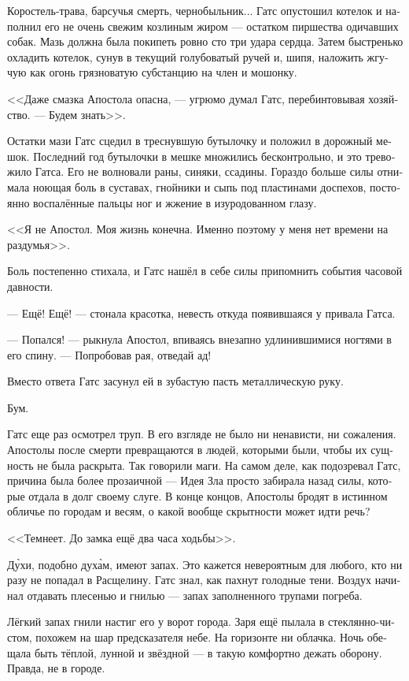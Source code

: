 \documentclass[a4paper,12pt,fleqn]{book}\usepackage{polyglossia}\setdefaultlanguage[babelshorthands=true]{russian}\setotherlanguage{english}\defaultfontfeatures{Ligatures=TeX,Mapping=tex-text}\usepackage{xcolor}\newcommand{\ml}[3]{#2}
\newcommand{\asterism}{\vspace{1em}{\centering\Large\bfseries$\ast~\ast~\ast$\par}\vspace{1em}}
\begin{document}
Коростель-трава, барсучья смерть, чернобыльник...
Гатс опустошил котелок и наполнил его не очень свежим козлиным жиром --- остатком пиршества одичавших собак.
Мазь должна была покипеть ровно сто три удара сердца.
Затем быстренько охладить котелок, сунув в текущий голубоватый ручей и, шипя, наложить жгучую как огонь грязноватую субстанцию на член и мошонку.

<<Даже смазка Апостола опасна, --- угрюмо думал Гатс, перебинтовывая хозяйство.
--- Будем знать>>.

Остатки мази Гатс сцедил в треснувшую бутылочку и положил в дорожный мешок.
Последний год бутылочки в мешке множились бесконтрольно, и это тревожило Гатса.
Его не волновали раны, синяки, ссадины.
Гораздо больше силы отнимала ноющая боль в суставах, гнойники и сыпь под пластинами доспехов, постоянно воспалённые пальцы ног и жжение в изуродованном глазу.

<<Я не Апостол.
Моя жизнь конечна.
Именно поэтому у меня нет времени на раздумья>>.

Боль постепенно стихала, и Гатс нашёл в себе силы припомнить события часовой давности.

--- Ещё!
Ещё! --- стонала красотка, невесть откуда появившаяся у привала Гатса.

--- Попался! --- рыкнула Апостол, впиваясь внезапно удлинившимися ногтями в его спину.
--- Попробовав рая, отведай ад!

Вместо ответа Гатс засунул ей в зубастую пасть металлическую руку.

Бум.

Гатс еще раз осмотрел труп.
В его взгляде не было ни ненависти, ни сожаления.
Апостолы после смерти превращаются в людей, которыми были, чтобы их сущность не была раскрыта.
Так говорили маги.
На самом деле, как подозревал Гатс, причина была более прозаичной --- Идея Зла просто забирала назад силы, которые отдала в долг своему слуге.
В конце концов, Апостолы бродят в истинном обличье по городам и весям, о какой вообще скрытности может идти речь?

<<Темнеет.
До замка ещё два часа ходьбы>>.

\asterism

Д\`{у}хи, подобно дух\`{а}м, имеют запах.
Это кажется невероятным для любого, кто ни разу не попадал в Расщелину.
Гатс знал, как пахнут голодные тени.
Воздух начинал отдавать плесенью и гнилью --- запах заполненного трупами погреба.

Лёгкий запах гнили настиг его у ворот города.
Заря ещё пылала в стеклянно-чистом, похожем на шар предсказателя небе.
На горизонте ни облачка.
Ночь обещала быть тёплой, лунной и звёздной --- в такую комфортно дежать оборону.
Правда, не в городе.
\end{document}
